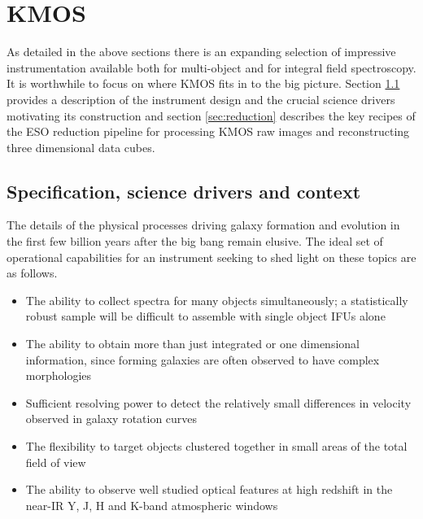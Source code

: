 \documentclass{literature}
\begin{document}
 

\section{KMOS}\label{sec:KMOS}
As detailed in the above sections there is an expanding selection of impressive instrumentation available both for multi-object and for integral field spectroscopy. It is worthwhile to focus on where KMOS fits in to the big picture. Section \ref{subsec:instrument} provides a description of the instrument design and the crucial science drivers motivating its construction and section \ref{sec:reduction} describes the key recipes of the ESO reduction pipeline for processing KMOS raw images and reconstructing three dimensional data cubes. 

\subsection{Specification, science drivers and context}\label{subsec:instrument}
The details of the physical processes driving galaxy formation and evolution in the first few billion years after the big bang remain elusive. The ideal set of operational capabilities for an instrument seeking to shed light on these topics are as follows. 
\begin{itemize}
	\item The ability to collect spectra for many objects simultaneously; a statistically robust sample will be difficult to assemble with single object IFUs alone 
	\item The ability to obtain more than just integrated or one dimensional information, since forming galaxies are often observed to have complex morphologies 
	\item Sufficient resolving power to detect the relatively small differences in velocity observed in galaxy rotation curves
	\item The flexibility to target objects clustered together in small areas of the total field of view 
	\item The ability to observe well studied optical features at high redshift in the near-IR Y, J, H and K-band atmospheric windows    
\end{itemize}
\end{document}
